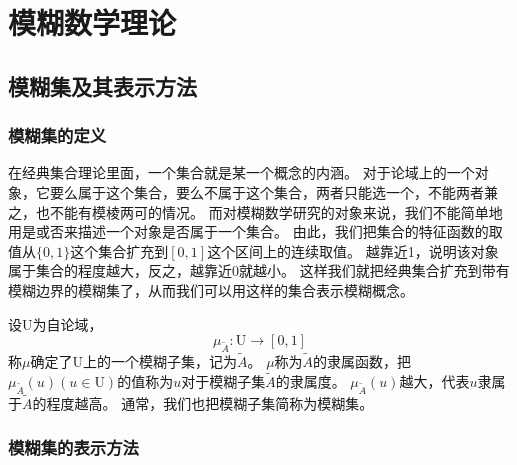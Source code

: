 \chapter[模糊数学理论]{模糊数学理论}
\section{模糊集及其表示方法}
\subsection{模糊集的定义}
\par
在经典集合理论里面，一个集合就是某一个概念的内涵。
对于论域上的一个对象，它要么属于这个集合，要么不属于这个集合，两者只能选一个，不能两者兼之，也不能有模棱两可的情况。
而对模糊数学研究的对象来说，我们不能简单地用是或否来描述一个对象是否属于一个集合。
由此，我们把集合的特征函数的取值从$\{0,1\}$这个集合扩充到$[0,1]$这个区间上的连续取值。
越靠近1，说明该对象属于集合的程度越大，反之，越靠近0就越小。
这样我们就把经典集合扩充到带有模糊边界的模糊集了，从而我们可以用这样的集合表示模糊概念。
\begin{definition}
    设$\mathrm{U}$为自论域，
    \[
        \mu_{\tilde{A}}: \mathrm{U} \longrightarrow[0,1]
    \]
    称$\mu$确定了$\mathrm{U}$上的一个模糊子集，记为$\tilde{A}$。
    $\mu$称为$\tilde{A}$的隶属函数，把$\mu_{\tilde{A}}(u)(u \in \mathrm{U})$的值称为$u$对于模糊子集$\tilde{A}$的隶属度。
    $\mu_{\tilde{A}}(u)$越大，代表$u$隶属于$\tilde{A}$的程度越高。
    通常，我们也把模糊子集简称为模糊集。
\end{definition}
\subsection{模糊集的表示方法}
